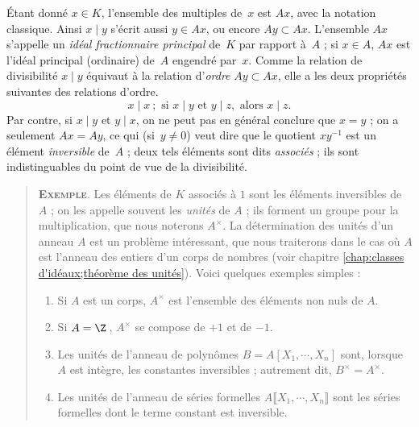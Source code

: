 \documentclass[11pt, %
  title in boldface,
  theorem in new line,
  theorem numbering = section,
  number theorems separately,
  simple name,
]{beaulivre}
\begin{document}
    Étant donné \( x \in K \), l'ensemble des multiples de~\( x \) est \( Ax \), avec la notation classique. Ainsi \( x \mid y \) s'écrit aussi \( y \in Ax \), ou encore \( Ay \subset Ax \). L'ensemble \( Ax \) s'appelle un \emph{idéal fractionnaire principal} de~\( K \) par rapport à~\( A \) ; si \( x \in A \), \( Ax \) est l'idéal principal (ordinaire) de~\( A \) engendré par~\( x \). Comme la relation de divisibilité \( x \mid y \) équivaut à la relation d'\emph{ordre} \( Ay \subset Ax \), elle a les deux propriétés suivantes des relations d'ordre.
    \begin{equation}
        x \mid x  ~;
        \text{ si } x \mid y \text{ et } y \mid z, \text{ alors } x \mid z.
    \end{equation}
    Par contre, si \( x \mid y \) et \( y \mid x \), on ne peut pas en général conclure que \( x = y \) ; on a seulement \( Ax = Ay \), ce qui (si~\( y \neq 0 \)) veut dire que le quotient \( x y^{-1} \) est un élément \emph{inversible} de~\( A \) ; deux tels éléments sont dits \emph{associés} ; ils sont indistinguables du point de vue de la divisibilité.

    \begin{quote}
        \textsc{\textbf{Exemple}}.
        Les éléments de \( K \) associés à \( 1 \) sont les éléments inversibles de \( A \) ; on les appelle souvent les \emph{unités} de \( A \) ; ils forment un groupe pour la multiplication, que nous noterons \( A^\times \). La détermination des unités d'un anneau \( A \) est un problème intéressant, que nous traiterons dans le cas où \( A \) est l'anneau des entiers d'un corps de nombres (voir chapitre \cref{chap:classes d'idéaux;théorème des unités}). Voici quelques exemples simples :
        \begin{enumerate}
            \item Si \( A \) est un corps, \( A^\times \) est l'ensemble des éléments non nuls de \( A \).
            \item Si \( A = \Z \)\,, \( A^\times \) se compose de \( +1 \) et de \( -1 \).
            \item Les unités de l'anneau de polynômes \( B = A[X_1, \cdots, X_n] \) sont, lorsque \( A \) est intègre, les constantes inversibles ; autrement dit, \( B^\times = A^\times \).
            \item Les unités de l'anneau de séries formelles \( A\lBrack X_1, \cdots, X_n \rBrack \) sont les séries formelles dont le terme constant est inversible.
        \end{enumerate}
    \end{quote}
\end{document}
